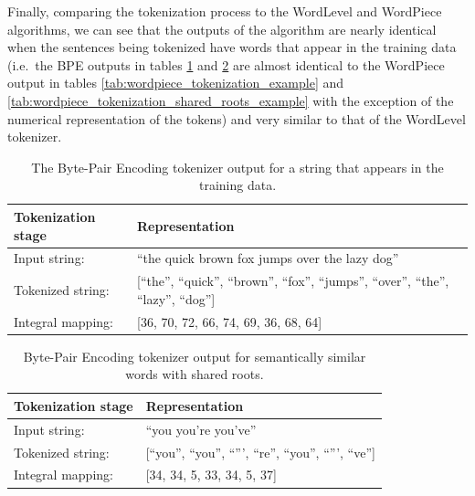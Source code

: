 \documentclass[12pt]{article}
\begin{document}
Finally, comparing the tokenization process to the WordLevel and WordPiece algorithms, we can see that the outputs of the algorithm are nearly
identical when the sentences being tokenized have words that appear in the training data (i.e.~the BPE outputs in tables
\ref{tab:bpe_tokenization_example} and \ref{tab:bpe_shared_roots_example} are almost identical to the WordPiece output in tables
\ref{tab:wordpiece_tokenization_example} and \ref{tab:wordpiece_tokenization_shared_roots_example} with the exception of the numerical representation
of the tokens) and very similar to that of the WordLevel tokenizer.

\begin{table}[h!]
    \centering
    \begin{tabular}{l l}
        \toprule
        Tokenization stage & Representation                                                                            \\
        \midrule
        Input string:      & ``the quick brown fox jumps over the lazy dog''                                           \\
        Tokenized string:  & [``the'', ``quick'', ``brown'', ``fox'', ``jumps'', ``over'', ``the'', ``lazy'', ``dog''] \\
        Integral mapping:  & [36, 70, 72, 66, 74, 69, 36, 68, 64]                                                      \\
        \bottomrule
    \end{tabular}
    \caption{The Byte-Pair Encoding tokenizer output for a string that appears in the training data.}
    \label{tab:bpe_tokenization_example}
\end{table}

\begin{table}[h!]
    \centering
    \begin{tabular}{l l}
        \toprule
        Tokenization stage & Representation                                            \\
        \midrule
        Input string:      & ``you you're you've''                                     \\
        Tokenized string:  & [``you'', ``you'', ``''', ``re'', ``you'', ``''', ``ve''] \\
        Integral mapping:  & [34, 34, 5, 33, 34, 5, 37]                                \\
        \bottomrule
    \end{tabular}
    \caption{Byte-Pair Encoding tokenizer output for semantically similar words with shared roots.}
    \label{tab:bpe_shared_roots_example}
\end{table}
\end{document}

